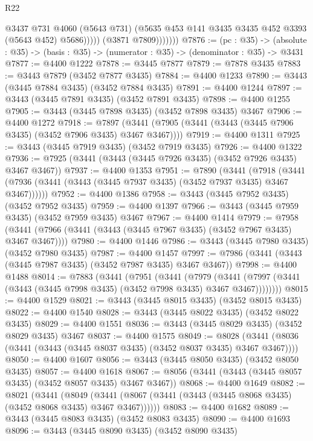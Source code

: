 \begin{lexlean}{R22}
\begin{coremodule}
                        @3437
                        @731
                        @4060
                        (@5643 @731)
                        (@5635 @453 @141 @3435 @3435 @452 @3393 (@5643 @452) @5686)))))
                (@3871 @7809)))))))
@7876 := (pc : @35) ->
  (absolute : @35) -> (basis : @35) -> (numerator : @35) -> (denominator : @35) -> @3431
@7877 := @4400 @1222
@7878 := @3445 @7877
@7879 := @7878 @3435
@7883 := @3443 @7879 (@3452 @7877 @3435)
@7884 := @4400 @1233
@7890 := @3443 (@3445 @7884 @3435) (@3452 @7884 @3435)
@7891 := @4400 @1244
@7897 := @3443 (@3445 @7891 @3435) (@3452 @7891 @3435)
@7898 := @4400 @1255
@7905 := @3443 (@3445 @7898 @3435) (@3452 @7898 @3435) @3467
@7906 := @4400 @1272
@7918 := @7897 (@3441 (@7905 (@3441 (@3443 (@3445 @7906 @3435) (@3452 @7906 @3435) @3467 @3467))))
@7919 := @4400 @1311
@7925 := @3443 (@3445 @7919 @3435) (@3452 @7919 @3435)
@7926 := @4400 @1322
@7936 := @7925 (@3441 (@3443 (@3445 @7926 @3435) (@3452 @7926 @3435) @3467 @3467))
@7937 := @4400 @1353
@7951 := @7890
    (@3441
      (@7918 (@3441 (@7936 (@3441 (@3443 (@3445 @7937 @3435) (@3452 @7937 @3435) @3467 @3467))))))
@7952 := @4400 @1386
@7958 := @3443 (@3445 @7952 @3435) (@3452 @7952 @3435)
@7959 := @4400 @1397
@7966 := @3443 (@3445 @7959 @3435) (@3452 @7959 @3435) @3467
@7967 := @4400 @1414
@7979 := @7958 (@3441 (@7966 (@3441 (@3443 (@3445 @7967 @3435) (@3452 @7967 @3435) @3467 @3467))))
@7980 := @4400 @1446
@7986 := @3443 (@3445 @7980 @3435) (@3452 @7980 @3435)
@7987 := @4400 @1457
@7997 := @7986 (@3441 (@3443 (@3445 @7987 @3435) (@3452 @7987 @3435) @3467 @3467))
@7998 := @4400 @1488
@8014 := @7883
    (@3441
      (@7951
        (@3441
          (@7979
            (@3441 (@7997 (@3441 (@3443 (@3445 @7998 @3435) (@3452 @7998 @3435) @3467 @3467))))))))
@8015 := @4400 @1529
@8021 := @3443 (@3445 @8015 @3435) (@3452 @8015 @3435)
@8022 := @4400 @1540
@8028 := @3443 (@3445 @8022 @3435) (@3452 @8022 @3435)
@8029 := @4400 @1551
@8036 := @3443 (@3445 @8029 @3435) (@3452 @8029 @3435) @3467
@8037 := @4400 @1575
@8049 := @8028 (@3441 (@8036 (@3441 (@3443 (@3445 @8037 @3435) (@3452 @8037 @3435) @3467 @3467))))
@8050 := @4400 @1607
@8056 := @3443 (@3445 @8050 @3435) (@3452 @8050 @3435)
@8057 := @4400 @1618
@8067 := @8056 (@3441 (@3443 (@3445 @8057 @3435) (@3452 @8057 @3435) @3467 @3467))
@8068 := @4400 @1649
@8082 := @8021
    (@3441
      (@8049 (@3441 (@8067 (@3441 (@3443 (@3445 @8068 @3435) (@3452 @8068 @3435) @3467 @3467))))))
@8083 := @4400 @1682
@8089 := @3443 (@3445 @8083 @3435) (@3452 @8083 @3435)
@8090 := @4400 @1693
@8096 := @3443 (@3445 @8090 @3435) (@3452 @8090 @3435)

\end{coremodule}
\end{lexlean}

